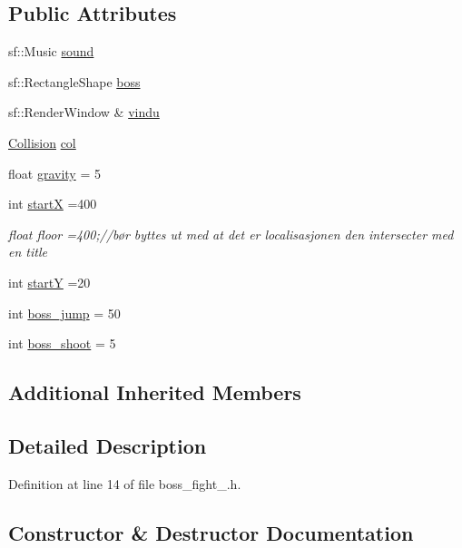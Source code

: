 \subsection*{Public Attributes}
\begin{DoxyCompactItemize}
\item 
sf\+::\+Music \hyperlink{classboss__fight__1_a7256c118906cf857f86beeb667291a91}{sound}
\item 
sf\+::\+Rectangle\+Shape \hyperlink{classboss__fight__1_a1bbb6010e2d4fce0052b99b66968e694}{boss}
\item 
sf\+::\+Render\+Window \& \hyperlink{classboss__fight__1_a87a27b1265ff58f25c6074405c93487e}{vindu}
\item 
\hyperlink{class_collision}{Collision} \hyperlink{classboss__fight__1_a7419d00c4958618eaffb181617305d22}{col}
\item 
float \hyperlink{classboss__fight__1_a4f0ada94e6586c2e825abaf789d9269d}{gravity} = 5
\item 
int \hyperlink{classboss__fight__1_af45fe739248b1b3da432ec4ab0770913}{startX} =400
\begin{DoxyCompactList}\small\item\em float floor =400;//bør byttes ut med at det er localisasjonen den intersecter med en title \end{DoxyCompactList}\item 
int \hyperlink{classboss__fight__1_a71884d8bccccd003e7b53acc6b86d513}{startY} =20
\item 
int \hyperlink{classboss__fight__1_ab020b6b32106cae5a2bdddef0443e5eb}{boss\+\_\+jump} = 50
\item 
int \hyperlink{classboss__fight__1_acdad682eac9821b3c2eb876eb1d99b90}{boss\+\_\+shoot} = 5
\end{DoxyCompactItemize}
\subsection*{Additional Inherited Members}


\subsection{Detailed Description}


Definition at line 14 of file boss\+\_\+fight\+\_.\+h.



\subsection{Constructor \& Destructor Documentation}
\hypertarget{classboss__fight__1_a189fa85c3b23bb89776bebaa9f8dce70}{}\label{classboss__fight__1_a189fa85c3b23bb89776bebaa9f8dce70} 
